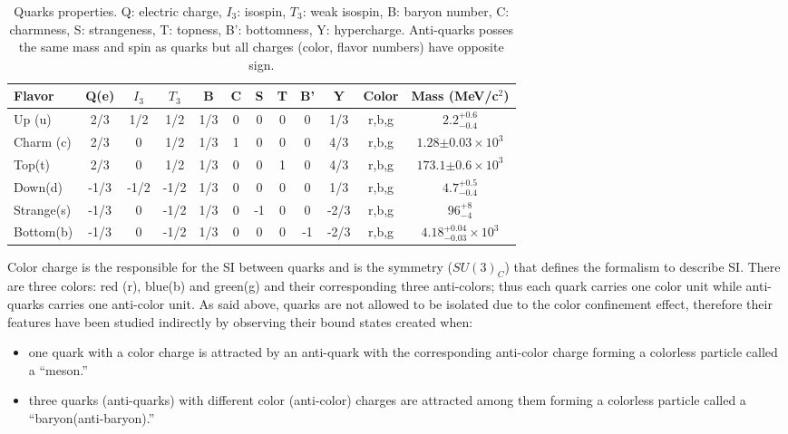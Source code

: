 \begin{center}
\begin{table}[h!]
\centering
\footnotesize
\begin{tabular}{lccccccccccc} \hline
Flavor     & Q(e) & $I_3$ & $T_3$  & B   & C & S  & T & B'  & Y    & Color &Mass (MeV/c$^2$)                  \\ \hline
Up (u)     & 2/3  & 1/2   &  1/2   & 1/3 & 0 & 0  & 0 & 0   & 1/3  & r,b,g &$2.2^{+0.6}_{-0.4}$               \\ %
Charm (c)  & 2/3  & 0     &  1/2   & 1/3 & 1 & 0  & 0 & 0   & 4/3  & r,b,g &$1.28 {\pm 0.03}\times 10^3$      \\ %
Top(t)     & 2/3  & 0     &  1/2   & 1/3 & 0 & 0  & 1 & 0   & 4/3  & r,b,g &$173.1{\pm0.6}\times 10^3$        \\ \hline
Down(d)    & -1/3 & -1/2  & -1/2   & 1/3 & 0 & 0  & 0 & 0   & 1/3  & r,b,g &$4.7^{+0.5}_{-0.4}$               \\ %
Strange(s) & -1/3 & 0     & -1/2   & 1/3 & 0 & -1 & 0 & 0   & -2/3 & r,b,g &$96^{+8}_{-4}$                    \\ %
Bottom(b)  & -1/3 & 0     & -1/2   & 1/3 & 0 & 0  & 0 & -1  & -2/3 & r,b,g &$4.18^{+0.04}_{-0.03}\times 10^3$ \\ \hline
\end{tabular}
\caption[Quarks properties.]{Quarks properties\cite{pdg}. Q: electric charge, $I_3$: isospin, $T_3$: weak isospin, B: baryon number, C: charmness, S: strangeness, T: topness, B': bottomness, Y: hypercharge. Anti-quarks posses the same mass and spin as quarks but all charges (color, flavor numbers) have opposite sign.}\label{quarks}
\end{table}
\end{center}

\noindent Color charge is the responsible for the SI between quarks and is the symmetry ($SU(3)_C$) that defines the formalism to describe SI. There are three colors: red (r), blue(b) and green(g) and their corresponding three anti-colors; thus each quark carries one color unit while anti-quarks carries one anti-color unit. As said above, quarks are not allowed to be isolated due to the color confinement effect, therefore their features have been studied indirectly by observing their bound states created when:

\begin{itemize}
\item one quark with a color charge is attracted by an anti-quark with the corresponding anti-color charge forming a colorless particle called a ``meson.''
\item three quarks (anti-quarks) with different color (anti-color) charges are attracted among them forming a colorless particle called a ``baryon(anti-baryon).''          
\end{itemize}

